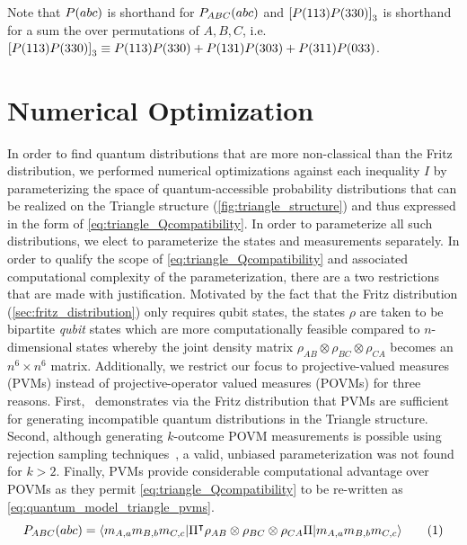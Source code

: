 \documentclass[aps, 10pt, english, twoside, pra, nofootinbib, tightenlines, longbibliography, superscriptaddress]{revtex4-1}
\begin{document}
    Note that $\prob\br{abc}$ is shorthand for $\prob[ABC]\br{abc}$ and $\bs{P(113)P(330)}_3$ is shorthand for a sum the over permutations of $A,B,C$, i.e. $\bs{P(113)P(330)}_3 \defined P(113)P(330) + P(131)P(303) + P(311)P(033)$.


    \section{Numerical Optimization}\label{sec:optimizations}

    In order to find quantum distributions that are more non-classical than the Fritz distribution, we performed numerical optimizations against each inequality $I$ by parameterizing the space of quantum-accessible probability distributions that can be realized on the Triangle structure (\cref{fig:triangle_structure}) and thus expressed in the form of \cref{eq:triangle_Qcompatibility}. In order to parameterize all such distributions, we elect to parameterize the states and measurements separately. In order to qualify the scope of \cref{eq:triangle_Qcompatibility} and associated computational complexity of the parameterization, there are a two restrictions that are made with justification. Motivated by the fact that the Fritz distribution (\cref{sec:fritz_distribution}) only requires qubit states, the states $\rho$ are taken to be bipartite \textit{qubit} states which are more computationally feasible compared to $n$-dimensional states whereby the joint density matrix $\rho_{AB}\otimes\rho_{BC}\otimes\rho_{CA}$ becomes an $n^6 \times n^6$ matrix. Additionally, we restrict our focus to projective-valued measures (PVMs) instead of projective-operator valued measures (POVMs) for three reasons. First,~\citet{Fritz_2012} demonstrates via the Fritz distribution that PVMs are sufficient for generating incompatible quantum distributions in the Triangle structure. Second, although generating $k$-outcome POVM measurements is possible using rejection sampling techniques~\cite{Petz_2015}, a valid, unbiased parameterization was not found for $k > 2$. Finally, PVMs provide considerable computational advantage over POVMs as they permit \cref{eq:triangle_Qcompatibility} to be re-written as \cref{eq:quantum_model_triangle_pvms}.
    \[ \prob[ABC]\br{abc} = \bramidket{m_{A,a}m_{B,b}m_{C,c}}{\netperm^\intercal \rho_{AB}\otimes\rho_{BC}\otimes\rho_{CA} \netperm}{m_{A,a}m_{B,b}m_{C,c}} \eq \label{eq:quantum_model_triangle_pvms}\]
\end{document}

